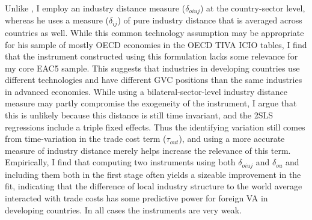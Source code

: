\documentclass[a4paper]{article}
\begin{document}
Unlike \citet{Kummritz20161}, I employ an industry distance measure ($\delta_{oiuj}$) at the country-sector level, whereas he uses a measure ($\delta_{ij}$) of pure industry distance that is averaged across countries as well. While this common technology assumption may be appropriate for his sample of mostly OECD economies in the OECD TIVA ICIO tables, I find that the instrument constructed using this formulation lacks some relevance for my core EAC5 sample. This suggests that industries in developing countries use different technologies and have different GVC positions than the same industries in advanced economies. While using a bilateral-sector-level industry distance measure may partly compromise the exogeneity of the instrument, I argue that this is unlikely because this distance is still time invariant, and the 2SLS regressions include a triple fixed effects. Thus the identifying variation still comes from time-variation in the trade cost term ($\tau_{out}$), and using a more accurate measure of industry distance merely helps increase the relevance of this term. Empirically, I find that computing two instruments using both $\delta_{oiuj}$ and $\delta_{ou}$ and including them both in the first stage often yields a sizeable improvement in the fit, indicating that the difference of local industry structure to the world average interacted with trade costs has some predictive power for foreign VA in developing countries. In all cases the instruments are very weak.  \newline %
\end{document}
